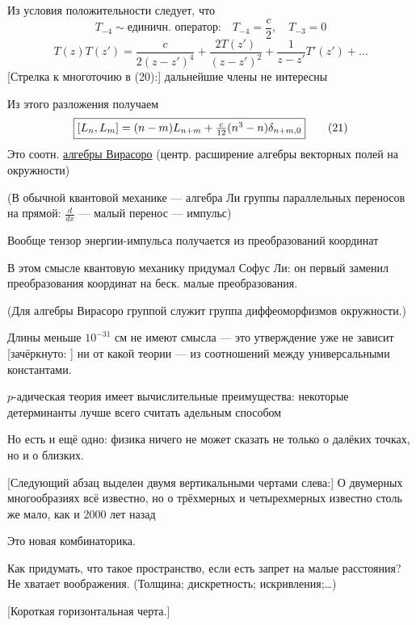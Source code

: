 Из условия положительности следует, что
\begin{equation*}
T_{-4}\sim\text{единичн. оператор:}\quad T_{-4}=\frac c2,\quad T_{-3}=0
\tag{19}
\end{equation*}
\begin{equation*}
T(z)T(z')=\frac{c}{2(z-z')^4}+\frac{2T(z')}{(z-z')^2}
+\frac{1}{z-z'}T'(z')+\ldots
\tag{20}
\end{equation*}
[Стрелка к многоточию в (20):] дальнейшие члены не интересны

Из этого разложения получаем
\begin{equation*}
\fbox{$[L_n,L_m]=(n-m)L_{n+m}+\frac{c}{12}(n^3-n)\delta_{n+m,0}$}
\tag{21}
\end{equation*}
Это соотн. \underline{алгебры Вирасоро} (центр. расширение алгебры векторных полей на окружности)

(В обычной квантовой механике — алгебра Ли группы параллельных переносов на прямой: $\frac{d}{dx}$ — малый перенос — импульс)

Вообще тензор энергии-импульса получается из преобразований координат

В этом смысле квантовую механику придумал Софус Ли: он первый заменил преобразования координат на беск. малые преобразования.

(Для алгебры Вирасоро группой служит группа диффеоморфизмов окружности.)

Длины меньше $10^{-31}$ см не имеют смысла — это утверждение уже не зависит
[зачёркнуто: ]
ни от какой теории — из соотношений между универсальными константами.


$p$-адическая теория имеет вычислительные преимущества: некоторые детерминанты лучше всего считать адельным способом

Но есть и ещё одно: физика ничего не может сказать не только о далёких точках, но и о близких.

[Следующий абзац выделен двумя вертикальными чертами слева:]
О двумерных многообразиях всё известно, но о трёхмерных и четырехмерных известно столь же мало, как и 2000 лет назад

Это новая комбинаторика.

Как придумать, что такое пространство, если есть запрет на малые расстояния? Не хватает воображения. (Толщина; дискретность; искривления;\ldots)

[Короткая горизонтальная черта.]

